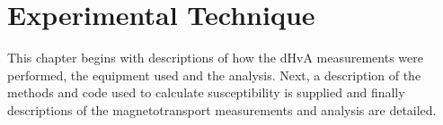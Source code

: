 \chapter{Experimental Technique}

\begin{chapterabstract}
This chapter begins with descriptions of how the \ac{dHvA} measurements were performed, the equipment used and the analysis. Next, a description of the methods and code used to calculate susceptibility is supplied and finally descriptions of the magnetotransport measurements and analysis are detailed.
\end{chapterabstract}









